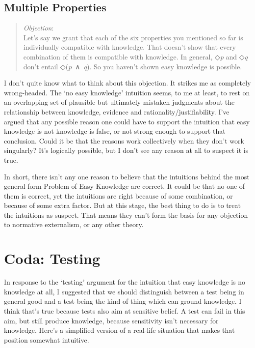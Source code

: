 \documentclass[
  10pt,
  letterpaper,
  twoside]{scrbook}
\begin{document}
\subsection{Multiple Properties}\label{multipleproperties}

\begin{quote}
\emph{Objection}:\\
Let's say we grant that each of the six properties you mentioned so far
is individually compatible with knowledge. That doesn't show that every
combination of them is compatible with knowledge. In general, ◇\emph{p}
and ◇\emph{q} don't entail ◇(\emph{p}~∧~\emph{q}). So you haven't shown
easy knowledge is possible.
\end{quote}

I don't quite know what to think about this objection. It strikes me as
completely wrong-headed. The `no easy knowledge' intuition seems, to me
at least, to rest on an overlapping set of plausible but ultimately
mistaken judgments about the relationship between knowledge, evidence
and rationality/justifiability. I've argued that any possible reason one
could have to support the intuition that easy knowledge is not knowledge
is false, or not strong enough to support that conclusion. Could it be
that the reasons work collectively when they don't work singularly? It's
logically possible, but I don't see any reason at all to suspect it is
true.

In short, there isn't any one reason to believe that the intuitions
behind the most general form Problem of Easy Knowledge are correct. It
could be that no one of them is correct, yet the intuitions are right
because of some combination, or because of some extra factor. But at
this stage, the best thing to do is to treat the intuitions as suspect.
That means they can't form the basis for any objection to normative
externalism, or any other theory.

\section{Coda: Testing}\label{coda:testing}

In response to the `testing' argument for the intuition that easy
knowledge is no knowledge at all, I suggested that we should distinguish
between a test being in general good and a test being the kind of thing
which can ground knowledge. I think that's true because tests also aim
at sensitive belief. A test can fail in this aim, but still produce
knowledge, because sensitivity isn't necessary for knowledge. Here's a
simplified version of a real-life situation that makes that position
somewhat intuitive.
\end{document}
